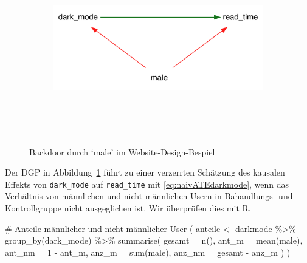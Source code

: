 \documentclass[
  a4paper,
  DIV=11,
  oneside]{scrreprt}
\newenvironment{Shaded}{\begin{snugshade}}{\end{snugshade}}
\newcommand{\AttributeTok}[1]{\textcolor[rgb]{0.40,0.45,0.13}{#1}}
\newcommand{\CommentTok}[1]{\textcolor[rgb]{0.37,0.37,0.37}{#1}}
\newcommand{\DecValTok}[1]{\textcolor[rgb]{0.68,0.00,0.00}{#1}}
\newcommand{\FunctionTok}[1]{\textcolor[rgb]{0.28,0.35,0.67}{#1}}
\newcommand{\NormalTok}[1]{\textcolor[rgb]{0.00,0.23,0.31}{#1}}
\newcommand{\OtherTok}[1]{\textcolor[rgb]{0.00,0.23,0.31}{#1}}
\newcommand{\SpecialCharTok}[1]{\textcolor[rgb]{0.37,0.37,0.37}{#1}}
\begin{document}
\begin{figure}

{\centering 

\begin{figure}[H]

{\centering \includegraphics[width=4in,height=3in]{Matching_files/figure-latex/dot-figure-1.png}

}

\end{figure}

}

\caption{\label{fig-maleCDdarkmode}Backdoor durch `male' im
Website-Design-Bespiel}

\end{figure}

Der DGP in Abbildung~\ref{fig-maleCDdarkmode} führt zu einer verzerrten
Schätzung des kausalen Effekts von \texttt{dark\_mode} auf
\texttt{read\_time} mit \eqref{eq:naivATEdarkmode}, wenn das Verhältnis
von männlichen und nicht-männlichen Usern in Bahandlungs- und
Kontrollgruppe nicht ausgeglichen ist. Wir überprüfen dies mit R.

\begin{Shaded}
\begin{Highlighting}[]
\CommentTok{\# Anteile männlicher und nicht{-}männlicher User}
\NormalTok{(}
\NormalTok{  anteile }\OtherTok{\textless{}{-}}\NormalTok{ darkmode }\SpecialCharTok{\%\textgreater{}\%} 
  \FunctionTok{group\_by}\NormalTok{(dark\_mode) }\SpecialCharTok{\%\textgreater{}\%} 
  \FunctionTok{summarise}\NormalTok{(}
    \AttributeTok{gesamt =} \FunctionTok{n}\NormalTok{(),}
    \AttributeTok{ant\_m =} \FunctionTok{mean}\NormalTok{(male),}
    \AttributeTok{ant\_nm =} \DecValTok{1} \SpecialCharTok{{-}}\NormalTok{ ant\_m,}
    \AttributeTok{anz\_m =} \FunctionTok{sum}\NormalTok{(male),}
    \AttributeTok{anz\_nm =}\NormalTok{ gesamt }\SpecialCharTok{{-}}\NormalTok{ anz\_m}
\NormalTok{    )}
\NormalTok{)}
\end{Highlighting}
\end{Shaded}
\end{document}
